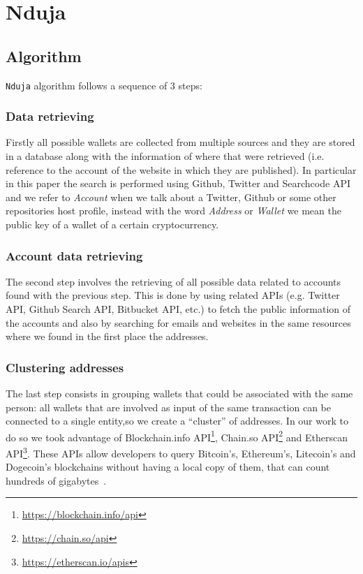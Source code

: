 \newcommand{\walletcollector}{\texttt{wallet\_collector}}
\newcommand{\userinforetriever}{\texttt{user\_info\_retriever}}
\newcommand{\addresschecker}{\texttt{address\_checker}}
\newcommand{\graph}{\texttt{graph}}

\section{Nduja} \label{nduja}

\subsection{Algorithm}
\texttt{Nduja} algorithm follows a sequence of 3 steps:
\subsubsection*{Data retrieving} Firstly all possible wallets are collected
from multiple sources and they are stored in a database along with the
information of where that were retrieved (i.e. reference to the account of the
website in which they are published). In particular in this paper the search is
performed using Github, Twitter and Searchcode API and we refer to
\textit{Account} when we talk about a Twitter, Github or some other
repositories host profile, instead with the word \textit{Address} or
\textit{Wallet} we mean the public key of a wallet of a certain
cryptocurrency.

\subsubsection*{Account data retrieving} The second step involves the
retrieving of all possible data related to accounts found with the previous
step. This is done by using related APIs (e.g. Twitter API, Github Search API,
Bitbucket API, etc.) to fetch the public information of the accounts and also
by searching for emails and websites in the same resources where we found in
the first place the addresses.

\subsubsection*{Clustering addresses} The last step consists in grouping
wallets that could be associated with the same person: all wallets that are
involved as input of the same transaction can be connected to a single
entity,so we create a ``cluster'' of addresses. In our work to do so we
took advantage of
Blockchain.info API\footnote{\url{https://blockchain.info/api}},
Chain.so API\footnote{\url{https://chain.so/api}} and
Etherscan API\footnote{\url{https://etherscan.io/apis}}. These APIs allow
developers to query Bitcoin's, Ethereum's, Litecoin's and Dogecoin's
blockchains without having a local copy of them, that can count
hundreds of gigabytes~\cite{bib:bitinfochart}.

